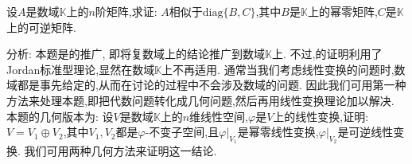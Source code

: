 \documentclass[../../main.tex]{subfiles}
\begin{document}
\begin{proposition}\label{proposition:数域K上矩阵的相似(幂零和可逆)分解}
设$A$是数域$\mathbb{K}$上的$n$阶矩阵,求证: $A$相似于$\mathrm{diag}\{B,C\}$,其中$B$是$\mathbb{K}$上的幂零矩阵,$C$是$\mathbb{K}$上的可逆矩阵.
\end{proposition}
\begin{remark}
分析: 本题是的推广, 即将复数域上的结论推广到数域$\mathbb{K}$上. 不过,的证明利用了Jordan标准型理论,显然在数域$\mathbb{K}$上不再适用. 通常当我们考虑线性变换的问题时,数域都是事先给定的,从而在讨论的过程中不会涉及数域的问题. 因此我们可用第一种方法来处理本题,即把代数问题转化成几何问题,然后再用线性变换理论加以解决. 本题的几何版本为: 设$V$是数域$\mathbb{K}$上的$n$维线性空间,$\varphi$是$V$上的线性变换,证明: $V = V_1\oplus V_2$,其中$V_1,V_2$都是$\varphi$-不变子空间,且$\varphi|_{V_1}$是幂零线性变换,$\varphi|_{V_2}$是可逆线性变换. 我们可用两种几何方法来证明这一结论.
\end{remark}
\end{document}
